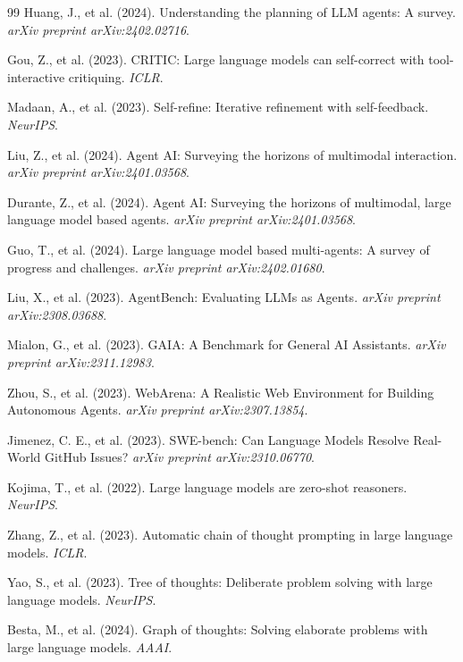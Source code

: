\documentclass[11pt,a4paper]{article}
\theoremstyle{definition}
\begin{document}
\begin{thebibliography}{99}
Huang, J., et al. (2024). Understanding the planning of LLM agents: A survey. \textit{arXiv preprint arXiv:2402.02716}.

Gou, Z., et al. (2023). CRITIC: Large language models can self-correct with tool-interactive critiquing. \textit{ICLR}.

Madaan, A., et al. (2023). Self-refine: Iterative refinement with self-feedback. \textit{NeurIPS}.

Liu, Z., et al. (2024). Agent AI: Surveying the horizons of multimodal interaction. \textit{arXiv preprint arXiv:2401.03568}.

Durante, Z., et al. (2024). Agent AI: Surveying the horizons of multimodal, large language model based agents. \textit{arXiv preprint arXiv:2401.03568}.

Guo, T., et al. (2024). Large language model based multi-agents: A survey of progress and challenges. \textit{arXiv preprint arXiv:2402.01680}.

Liu, X., et al. (2023). AgentBench: Evaluating LLMs as Agents. \textit{arXiv preprint arXiv:2308.03688}.

Mialon, G., et al. (2023). GAIA: A Benchmark for General AI Assistants. \textit{arXiv preprint arXiv:2311.12983}.

Zhou, S., et al. (2023). WebArena: A Realistic Web Environment for Building Autonomous Agents. \textit{arXiv preprint arXiv:2307.13854}.

Jimenez, C. E., et al. (2023). SWE-bench: Can Language Models Resolve Real-World GitHub Issues? \textit{arXiv preprint arXiv:2310.06770}.

Kojima, T., et al. (2022). Large language models are zero-shot reasoners. \textit{NeurIPS}.

Zhang, Z., et al. (2023). Automatic chain of thought prompting in large language models. \textit{ICLR}.

Yao, S., et al. (2023). Tree of thoughts: Deliberate problem solving with large language models. \textit{NeurIPS}.

Besta, M., et al. (2024). Graph of thoughts: Solving elaborate problems with large language models. \textit{AAAI}.


\end{thebibliography}
\end{document}
